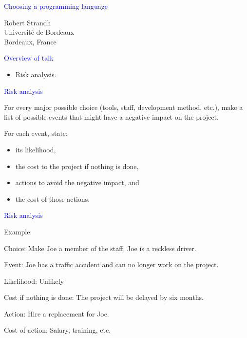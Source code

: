 \documentclass{slides}
\newcommand{\ti}[1]{\begin{center}\Large{\textcolor{blue}{#1}}\end{center}}
\begin{document}
\landscape
\setlength{\oddsidemargin}{1cm}
\setlength{\evensidemargin}{1cm}
\setlength{\marginparwidth}{1cm}
\setlength{\parskip}{0.5cm}
\setlength{\parindent}{0cm}
\begin{slide}\ti{Choosing a programming language}
\vskip 0.5cm
\begin{center}
Robert Strandh \\
Université de Bordeaux \\
Bordeaux, France
\end{center}
\vfill\end{slide}
\begin{slide}\ti{Overview of talk}

  \begin{itemize}
  \item Risk analysis.
  \end{itemize}

\vfill\end{slide}
\begin{slide}\ti{Risk analysis}

For every major possible choice (tools, staff, development method,
etc.), make a list of possible events that might have a negative
impact on the project.

For each event, state:

\begin{itemize}
\item its likelihood,
\item the cost to the project if nothing is done,
\item actions to avoid the negative impact, and
\item the cost of those actions.
\end{itemize}

\vfill\end{slide}
\begin{slide}\ti{Risk analysis}

Example:

Choice: Make Joe a member of the staff.  Joe is a reckless driver.

Event: Joe has a traffic accident and can no longer work on the
project. 

Likelihood: Unlikely

Cost if nothing is done: The project will be delayed by six months. 

Action: Hire a replacement for Joe.

Cost of action: Salary, training, etc.

\vfill\end{slide}
\end{document}
